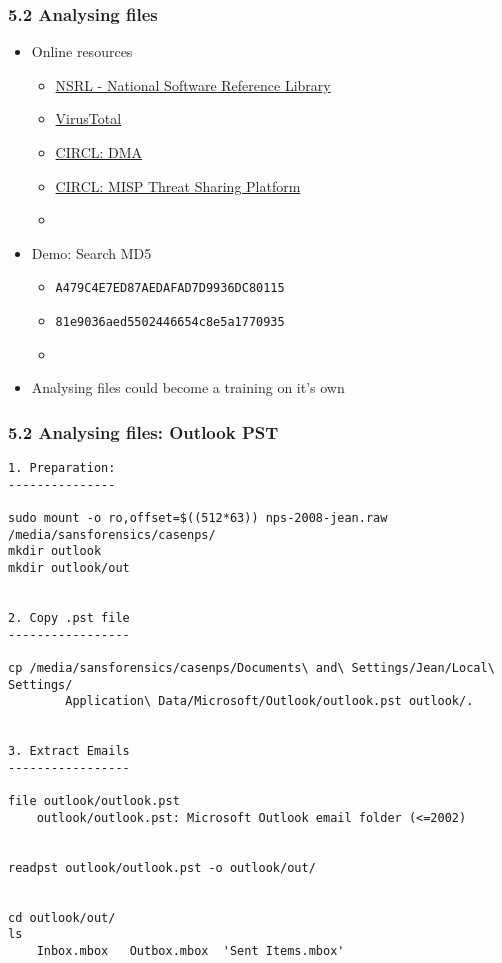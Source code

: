 \begin{frame}[fragile]
  \frametitle{5.2 Analysing files}
    \begin{itemize}
       \item Online resources
            \begin{itemize}
                \item[] \href{https://www.nist.gov/software-quality-group/national-software-reference-library-nsrl}{NSRL - National Software Reference Library}
                \item[] \href{https://www.virustotal.com/}{VirusTotal}
                \item[] \href{https://www.circl.lu/services/dynamic-malware-analysis/}{CIRCL: DMA}
                \item[] \href{https://www.circl.lu/services/misp-malware-information-sharing-platform/}{CIRCL: MISP Threat Sharing Platform}
                \item[]
            \end{itemize}
       \item Demo: Search MD5
            \begin{itemize}
                \item[] \texttt{A479C4E7ED87AEDAFAD7D9936DC80115}
                \item[] \texttt{81e9036aed5502446654c8e5a1770935}
                \item[] 
            \end{itemize}
       \item Analysing files could become a training on it's own
    \end{itemize}
\end{frame}


\begin{frame}[fragile]
  \frametitle{5.2 Analysing files: Outlook PST}
    \begin{lstlisting}[basicstyle=\tiny]
1. Preparation:
---------------

sudo mount -o ro,offset=$((512*63)) nps-2008-jean.raw /media/sansforensics/casenps/
mkdir outlook
mkdir outlook/out


2. Copy .pst file
-----------------

cp /media/sansforensics/casenps/Documents\ and\ Settings/Jean/Local\ Settings/
        Application\ Data/Microsoft/Outlook/outlook.pst outlook/.


3. Extract Emails
-----------------

file outlook/outlook.pst 
    outlook/outlook.pst: Microsoft Outlook email folder (<=2002)


readpst outlook/outlook.pst -o outlook/out/


cd outlook/out/
ls
    Inbox.mbox   Outbox.mbox  'Sent Items.mbox'
    \end{lstlisting}
\end{frame}


